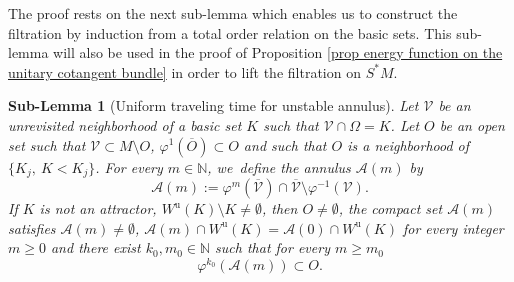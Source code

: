 \documentclass[JEP,XML,SOM,Unicode,NoEqCountersInSection,NoFloatCountersInSection,published]{cedram}
\newcommand{\ru}{\mathrm{u}}
\theoremstyle{definition}
\theoremstyle{plain}
\newtheorem{sublemma}[definition]{Sub-Lemma}
\newcommand{\Acal}{\mathcal{A}}
\newcommand{\N}{\mathbb{N}}
\newcommand{\Vcal}{\mathcal{V}}
\begin{document}
The proof rests on the next sub-lemma which enables us to construct the filtration by induction from a total order relation on the basic sets. This sub-lemma will also be used in the proof of Proposition \ref{prop energy function on the unitary cotangent bundle} in order to lift the filtration on $S^* M$.

\begin{sublemma}[Uniform traveling time for unstable annulus]\label{Sublemma: uniform traveling time for unstable annulus}
Let $\Vcal$ be an unrevisited neighborhood of a basic set $K$ such that $\Vcal \cap \Omega = K$. Let $O$ be an open set such that $\Vcal \subset M\setminus O$, $\varphi^1 (\overline{O}) \subset O$ and such that $O$ is a neighborhood of $\{K_j, \: K < K_j \}$. For every $m \in \N$, we~define the \textit{annulus} $\Acal (m)$ by
\[
\Acal (m):= \varphi^m (\overline{\Vcal}) \cap \overline{\Vcal} \setminus \varphi^{-1}(\Vcal).
\]
If $K$ is not an attractor, \ie $W^\ru (K) \setminus K \neq \emptyset$, then $O \neq \emptyset$, the compact set $\Acal (m)$ satisfies $\Acal (m) \neq \emptyset$, $\Acal(m) \cap W^\ru (K) = \Acal(0) \cap W^\ru (K)$ for every integer $m \geq 0$ and
there exist $k_0, m_0 \in \N$ such that for every $m\geq m_0$
\[
\varphi^{k_0} \left(\Acal (m) \right) \subset O.
\]
\end{sublemma}
\end{document}
